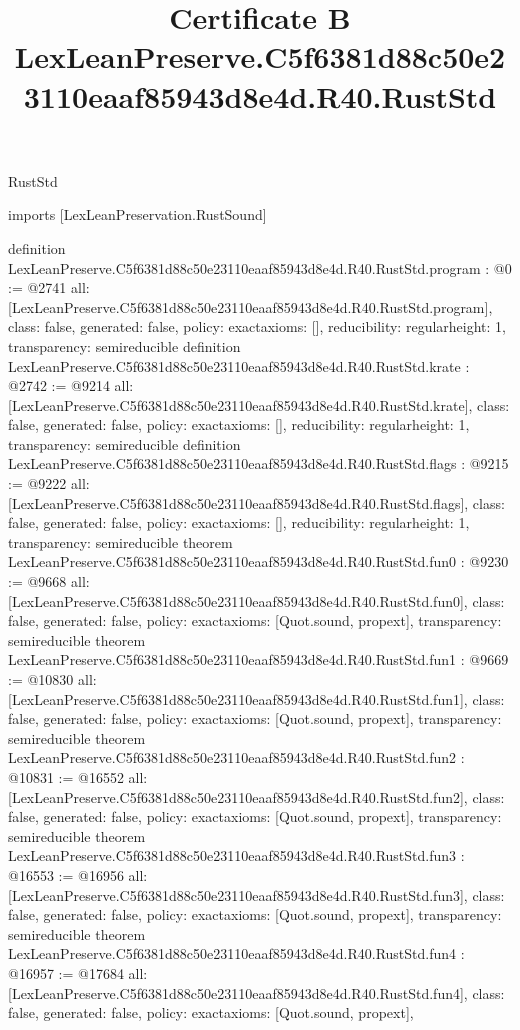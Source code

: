 \begin{lexlean}{RustStd}
\title{Certificate B LexLeanPreserve.C5f6381d88c50e23110eaaf85943d8e4d.R40.RustStd}
\begin{coremodule}
imports [LexLeanPreservation.RustSound]

definition LexLeanPreserve.C5f6381d88c50e23110eaaf85943d8e4d.R40.RustStd.program : @0 := @2741 {
  all: [LexLeanPreserve.C5f6381d88c50e23110eaaf85943d8e4d.R40.RustStd.program],
  class: false,
  generated: false,
  policy: exact{axioms: []},
  reducibility: regular{height: 1},
  transparency: semireducible
}
definition LexLeanPreserve.C5f6381d88c50e23110eaaf85943d8e4d.R40.RustStd.krate : @2742 := @9214 {
  all: [LexLeanPreserve.C5f6381d88c50e23110eaaf85943d8e4d.R40.RustStd.krate],
  class: false,
  generated: false,
  policy: exact{axioms: []},
  reducibility: regular{height: 1},
  transparency: semireducible
}
definition LexLeanPreserve.C5f6381d88c50e23110eaaf85943d8e4d.R40.RustStd.flags : @9215 := @9222 {
  all: [LexLeanPreserve.C5f6381d88c50e23110eaaf85943d8e4d.R40.RustStd.flags],
  class: false,
  generated: false,
  policy: exact{axioms: []},
  reducibility: regular{height: 1},
  transparency: semireducible
}
theorem LexLeanPreserve.C5f6381d88c50e23110eaaf85943d8e4d.R40.RustStd.fun0 : @9230 := @9668 {
  all: [LexLeanPreserve.C5f6381d88c50e23110eaaf85943d8e4d.R40.RustStd.fun0],
  class: false,
  generated: false,
  policy: exact{axioms: [Quot.sound, propext]},
  transparency: semireducible
}
theorem LexLeanPreserve.C5f6381d88c50e23110eaaf85943d8e4d.R40.RustStd.fun1 : @9669 := @10830 {
  all: [LexLeanPreserve.C5f6381d88c50e23110eaaf85943d8e4d.R40.RustStd.fun1],
  class: false,
  generated: false,
  policy: exact{axioms: [Quot.sound, propext]},
  transparency: semireducible
}
theorem LexLeanPreserve.C5f6381d88c50e23110eaaf85943d8e4d.R40.RustStd.fun2 : @10831 := @16552 {
  all: [LexLeanPreserve.C5f6381d88c50e23110eaaf85943d8e4d.R40.RustStd.fun2],
  class: false,
  generated: false,
  policy: exact{axioms: [Quot.sound, propext]},
  transparency: semireducible
}
theorem LexLeanPreserve.C5f6381d88c50e23110eaaf85943d8e4d.R40.RustStd.fun3 : @16553 := @16956 {
  all: [LexLeanPreserve.C5f6381d88c50e23110eaaf85943d8e4d.R40.RustStd.fun3],
  class: false,
  generated: false,
  policy: exact{axioms: [Quot.sound, propext]},
  transparency: semireducible
}
theorem LexLeanPreserve.C5f6381d88c50e23110eaaf85943d8e4d.R40.RustStd.fun4 : @16957 := @17684 {
  all: [LexLeanPreserve.C5f6381d88c50e23110eaaf85943d8e4d.R40.RustStd.fun4],
  class: false,
  generated: false,
  policy: exact{axioms: [Quot.sound, propext]},
}
\end{coremodule}
\end{lexlean}
